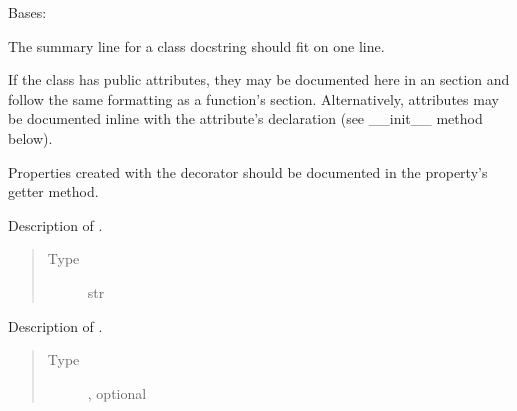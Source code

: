 \documentclass[letterpaper,10pt,english]{sphinxmanual}
\begin{document}
\begin{fulllineitems}
\label{\detokenize{source/example:example.ExampleClass}}
\pysigstartsignatures
{}
\pysigstopsignatures
\sphinxAtStartPar
Bases: 

\sphinxAtStartPar
The summary line for a class docstring should fit on one line.

\sphinxAtStartPar
If the class has public attributes, they may be documented here
in an  section and follow the same formatting as a
function’s  section. Alternatively, attributes may be documented
inline with the attribute’s declaration (see \_\_init\_\_ method below).

\sphinxAtStartPar
Properties created with the  decorator should be documented
in the property’s getter method.

\begin{fulllineitems}
\label{\detokenize{source/example:example.ExampleClass.attr1}}
\pysigstartsignatures
{}
\pysigstopsignatures
\sphinxAtStartPar
Description of .
\begin{quote}\begin{description}
\item[{Type}] \leavevmode
\sphinxAtStartPar
str

\end{description}\end{quote}

\end{fulllineitems}


\begin{fulllineitems}
\label{\detokenize{source/example:example.ExampleClass.attr2}}
\pysigstartsignatures
{}
\pysigstopsignatures
\sphinxAtStartPar
Description of .
\begin{quote}\begin{description}
\item[{Type}] \leavevmode
\sphinxAtStartPar
{}, optional


\end{description}
\end{quote}
\end{fulllineitems}
\end{fulllineitems}
\end{document}
